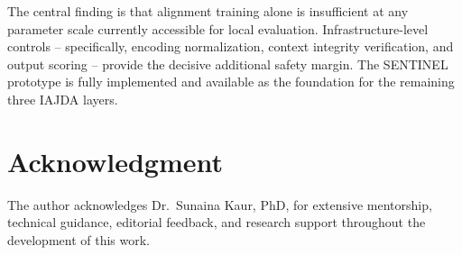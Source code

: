\documentclass[conference]{IEEEtran}
\begin{document}
The central finding is that alignment training alone is insufficient at any
parameter scale currently accessible for local evaluation.
Infrastructure-level controls -- specifically, encoding normalization, context
integrity verification, and output scoring -- provide the decisive additional
safety margin.
The SENTINEL prototype is fully implemented and available as the foundation for
the remaining three IAJDA layers.

\section*{Acknowledgment}
The author acknowledges Dr.\ Sunaina Kaur, PhD, for extensive mentorship,
technical guidance, editorial feedback, and research support throughout the
development of this work.

\end{document}
